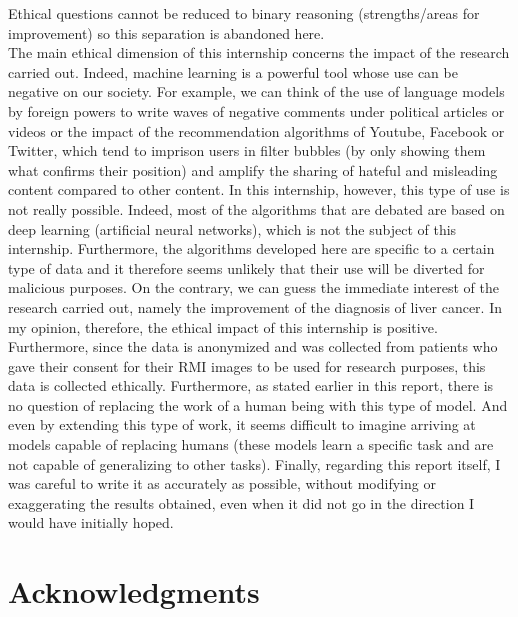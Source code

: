 \documentclass[preprint,12pt]{elsarticle}
\begin{document}
\noindent Ethical questions cannot be reduced to binary reasoning (strengths/areas for improvement) so this separation is abandoned here.\\
\indent The main ethical dimension of this internship concerns the impact of the research carried out. Indeed, machine learning is a powerful tool whose use can be negative on our society. For example, we can think of the use of language models by foreign powers to write waves of negative comments under political articles or videos or the impact of the recommendation algorithms of Youtube, Facebook or Twitter, which tend to imprison users in filter bubbles (by only showing them what confirms their position) and amplify the sharing of hateful and misleading content compared to other content. In this internship, however, this type of use is not really possible. Indeed, most of the algorithms that are debated are based on deep learning (artificial neural networks), which is not the subject of this internship. Furthermore, the algorithms developed here are specific to a certain type of data and it therefore seems unlikely that their use will be diverted for malicious purposes. On the contrary, we can guess the immediate interest of the research carried out, namely the improvement of the diagnosis of liver cancer. In my opinion, therefore, the ethical impact of this internship is positive.\\
\indent Furthermore, since the data is anonymized and was collected from patients who gave their consent for their RMI images to be used for research purposes, this data is collected ethically. Furthermore, as stated earlier in this report, there is no question of replacing the work of a human being with this type of model. And even by extending this type of work, it seems difficult to imagine arriving at models capable of replacing humans (these models learn a specific task and are not capable of generalizing to other tasks). Finally, regarding this report itself, I was careful to write it as accurately as possible, without modifying or exaggerating the results obtained, even when it did not go in the direction I would have initially hoped.

\newpage

\section{Acknowledgments}
\end{document}
